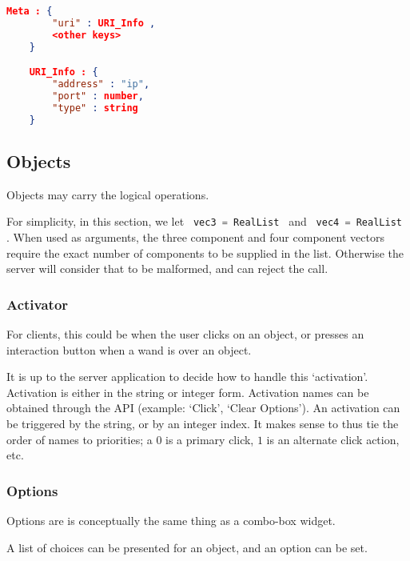 \documentclass[11pt, oneside]{amsart}
\begin{document}
\begin{lstlisting}[language=json, label=listing:simple_db_meta, caption=Table URI Field ]
	Meta : {
		"uri" : URI_Info ,
		<other keys>
	}

	URI_Info : {
		"address" : "ip",
		"port" : number,
		"type" : string
	}

\end{lstlisting}


\subsection{Objects}
\label{sec:obj_cap}

Objects may carry the logical operations.

For simplicity, in this section, we let \lstinline[language=c++]| vec3 = RealList | and \lstinline[language=c++]| vec4 = RealList |. When used as arguments, the three component and four component vectors require the exact number of components to be supplied in the list. Otherwise the server will consider that to be malformed, and can reject the call.

\subsubsection{Activator}

For clients, this could be when the user clicks on an object, or presses an interaction button when a wand is over an object.



 It is up to the server application to decide how to handle this `activation'. Activation is either in the string or integer form. Activation names can be obtained through the API (example: `Click', `Clear Options'). An activation can be triggered by the string, or by an integer index. It makes sense to thus tie the order of names to priorities; a $0$ is a primary click, $1$ is an alternate click action, etc.

\subsubsection{Options}

Options are is conceptually the same thing as a combo-box widget.



 A list of choices can be presented for an object, and an option can be set.
\end{document}
